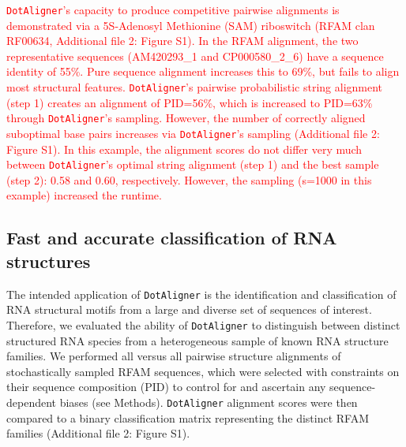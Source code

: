 \documentclass{bmcart}
\newcommand\dotaligner{\texttt{DotAligner}}
\begin{document}
\textcolor{red}{
\dotaligner's capacity to produce competitive pairwise alignments is demonstrated 
via a 5S-Adenosyl Methionine (SAM) riboswitch (RFAM clan RF00634, Additional file 2: Figure S1). 
In the RFAM alignment, the two representative sequences (AM420293\_1 and CP000580\_2\_6) 
have a sequence identity of 55\%. Pure sequence alignment increases this to 69\%, 
but fails to align most structural features. 
\dotaligner's pairwise probabilistic string alignment (step 1) creates an alignment of PID=56\%, which is increased to PID=63\% through \dotaligner's sampling.
However, the number of correctly aligned suboptimal base pairs increases via \dotaligner{}'s sampling (Additional file 2: Figure S1). In this example, the alignment scores do not differ very much between \dotaligner's optimal string alignment (step 1) and the best sample (step 2): 0.58 and 0.60, respectively. However, the sampling (s=1000 in this example) increased the runtime. \\ 
}

\subsection*{Fast and accurate classification of RNA structures} 

The intended application of \dotaligner{}  is the identification and
classification of RNA structural motifs from a large and diverse set of sequences of interest. 
Therefore, we evaluated the ability of \dotaligner{} to distinguish between distinct structured 
RNA species from a heterogeneous sample of known RNA structure families. 
We performed all versus all pairwise structure alignments of stochastically sampled RFAM sequences, 
which were selected with constraints on their sequence composition (PID) to 
control for and ascertain any sequence-dependent biases (see Methods). 
\dotaligner{} alignment scores were then compared to a binary classification matrix 
representing the distinct RFAM families (Additional file 2: Figure S1).\\
\end{document}
